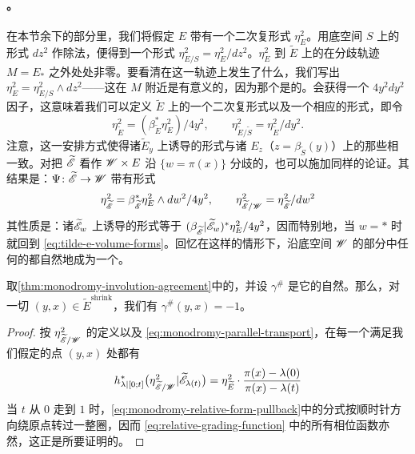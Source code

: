 \paragraph{\trGrading{}。}\label{sub:gradings}
在本节余下的部分里，我们将假定 $E$ 带有一个二次复\trVolume{}形式 $\eta_E^2$。用底空间 $S$ 上的形式 $dz^2$ 作除法，便得到一个\trRelative{}形式 $\eta^2_{E/S}=\eta_E^2/dz^2$。$\eta_E^2$ 到 $\widetilde{E}$ 上的\trPullback{}在分歧轨迹 $M=E_*$ 之外处处非零。要看清在这一轨迹上发生了什么，我们写出 $\eta_E^2=\eta^2_{E/S}\wedge dz^2$——这在 $M$ 附近是有意义的，因为那个\trFiber{}是\trNonsingular{}的。\trPullback{}会获得一个 $4y^2dy^2$ 因子，这意味着我们可以定义 $\widetilde{E}$ 上的一个二次复\trVolume{}形式以及一个相应的\trRelative{}形式，即令
\begin{equation}\label{eq:tilde-e-volume-forms}
\eta_{\widetilde{E}}^2=(\beta_{\widetilde{E}}^*\eta_E^2)/4y^2,\qquad
\eta_{\widetilde{E}/\widetilde{S}}^2=\eta_{\widetilde{E}}^2/dy^2.
\end{equation}
注意，这一安排方式使得诸\trNonsingular\trFiber{}$\widetilde{E}_y$ 上诱导的形式与诸 $E_z$（$z=\beta_{\widetilde{S}}(y)$）上的那些相一致。对把 $\widetilde{\mathscr{E}}$ 看作 $\mathscr{W}\times E$ 沿 $\{w=\pi(x)\}$ 分歧的\trDoubleCover，也可以施加同样的论证。其结果是：\trLefschetzFibration{}$\Psi\colon\widetilde{\mathscr{E}}\to\mathscr{W}$ 带有形式
\begin{equation*}
\eta_{\widetilde{\mathscr{E}}}^2=\beta_{\widetilde{\mathscr{E}}}^*\eta_E^2\wedge dw^2/4y^2,\qquad
\eta_{\widetilde{\mathscr{E}}/\mathscr{W}}^2=\eta_{\widetilde{\mathscr{E}}}^2/dw^2
\end{equation*}
其性质是：诸\trRegular\trFiber{}$\widetilde{\mathscr{E}}_w$ 上诱导的形式等于 $(\beta_{\widetilde{\mathscr{E}}}|\widetilde{\mathscr{E}}_w)^*\eta_E^2/4y^2$，因而特别地，当 $w=*$ 时就回到 \eqref{eq:tilde-e-volume-forms}。回忆在这样的情形下，沿底空间 $\mathscr{W}$ 的\trRegular{}部分中任何\trLoop{}的\trMonodromy{}都自然地成为一个\trGraded\trSymplectic\trAutomorphism。
\begin{lemma}\label{thm:monodromy-natural-grading}
取\cref{thm:monodromy-involution-agreement}中的\trMonodromy，并设 $\gamma^\#$ 是它的自然\trGrading。那么，对一切 $(y,x)\in\widetilde{E}^{\mathrm{shrink}}$，我们有 $\gamma^\#(y,x)=-1$。
\end{lemma}
\begin{proof}
按 $\eta^2_{\widetilde{\mathscr{E}}/\mathscr{W}}$ 的定义以及 \eqref{eq:monodromy-parallel-transport}，在每一个满足我们假定的点 $(y,x)$ 处都有
\begin{equation}\label{eq:monodromy-relative-form-pullback}
h_{\lambda|[0;t]}^*\bigl(\eta_{\widetilde{\mathscr{E}}/\mathscr{W}}^2|\widetilde{\mathscr{E}}_{\lambda(t)}\bigr)
=\eta_{\widetilde{E}}^2\cdot\frac{\pi(x)-\lambda(0)}{\pi(x)-\lambda(t)}
\end{equation}
当 $t$ 从 $0$ 走到 $1$ 时，\eqref{eq:monodromy-relative-form-pullback}中的分式按顺时针方向绕原点转过一整圈，因而 \eqref{eq:relative-grading-function} 中的所有相位函数亦然，这正是所要证明的。
\end{proof}
